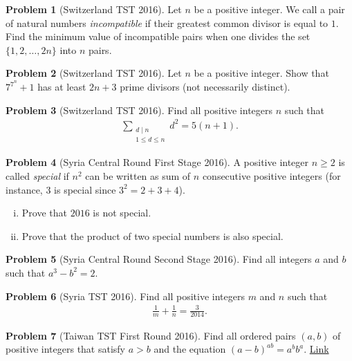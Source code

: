 \documentclass[]{article}
\theoremstyle{definition}
\newtheorem{problem}{Problem}
\begin{document}
\begin{problem}[Switzerland TST 2016]
	Let $n$ be a positive integer. We call a pair of natural numbers \textit{incompatible} if their greatest common divisor is equal to $1$. Find the minimum value of incompatible pairs when one divides the set $\{1,2,\dots,2n\}$ into $n$ pairs.
\end{problem}


\begin{problem}[Switzerland TST 2016]
	Let $n$ be a positive integer. Show that $7^{7^n} + 1$ has at least $2n + 3$ prime divisors (not necessarily distinct).
\end{problem}



\begin{problem}[Switzerland TST 2016]
	Find all positive integers $n$ such that
		\begin{align*}
			\sum_{\substack{d \mid n \\ 1 \leq d \leq n}} d^2 = 5(n+1).
		\end{align*}
\end{problem}


\begin{problem}[Syria Central Round First Stage 2016]
	A positive integer $n \geq 2$ is called \textit{special} if $n^2$ can be written as sum of $n$ consecutive positive integers (for instance, $3$ is special since $3^2 = 2 + 3 + 4$).
	\begin{enumerate}[(i)]
		\item Prove that $2016$ is not special.
		\item Prove that the product of two special numbers is also special.
	\end{enumerate}
\end{problem}


\begin{problem}[Syria Central Round Second Stage 2016]
	Find all integers $a$ and $b$ such that $a^3 - b^2 = 2$.
\end{problem}


\begin{problem}[Syria TST 2016]
	Find all positive integers $m$ and $n$ such that
		\begin{align*}
			\frac{1}{m} + \frac{1}{n} = \frac{3}{2014}.
		\end{align*}
\end{problem}



\begin{problem}[Taiwan TST First Round 2016]
	Find all ordered pairs $(a,b)$ of positive integers that satisfy $a>b$ and the equation $(a-b)^{ab}=a^bb^a$. \hfill \href{http://artofproblemsolving.com/community/c6h1269733p6630169}{Link}
\end{problem}
\end{document}
